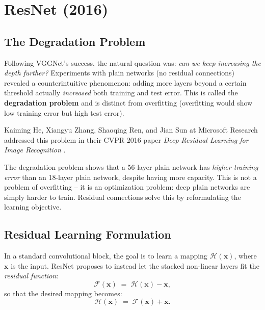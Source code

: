 \documentclass[12pt,a4paper]{article}
\begin{document}
\section{ResNet (2016)}
\label{sec:resnet}

\subsection{The Degradation Problem}

Following VGGNet's success, the natural question was: \emph{can we keep increasing the depth further?} Experiments with plain networks (no residual connections) revealed a counterintuitive phenomenon: adding more layers beyond a certain threshold actually \emph{increased} both training and test error. This is called the \textbf{degradation problem} and is distinct from overfitting (overfitting would show low training error but high test error).

Kaiming He, Xiangyu Zhang, Shaoqing Ren, and Jian Sun at Microsoft Research addressed this problem in their CVPR 2016 paper \emph{Deep Residual Learning for Image Recognition} \cite{resnet2016}.

\begin{keyinsight}
The degradation problem shows that a 56-layer plain network has \emph{higher training error} than an 18-layer plain network, despite having more capacity. This is not a problem of overfitting -- it is an optimization problem: deep plain networks are simply harder to train. Residual connections solve this by reformulating the learning objective.
\end{keyinsight}

\subsection{Residual Learning Formulation}

In a standard convolutional block, the goal is to learn a mapping $\mathcal{H}(\mathbf{x})$, where $\mathbf{x}$ is the input. ResNet proposes to instead let the stacked non-linear layers fit the \emph{residual function}:
\begin{equation}
  \mathcal{F}(\mathbf{x}) \;=\; \mathcal{H}(\mathbf{x}) - \mathbf{x},
  \label{eq:residual_def}
\end{equation}
so that the desired mapping becomes:
\begin{equation}
  \mathcal{H}(\mathbf{x}) \;=\; \mathcal{F}(\mathbf{x}) + \mathbf{x}.
  \label{eq:residual_mapping}
\end{equation}
\end{document}

